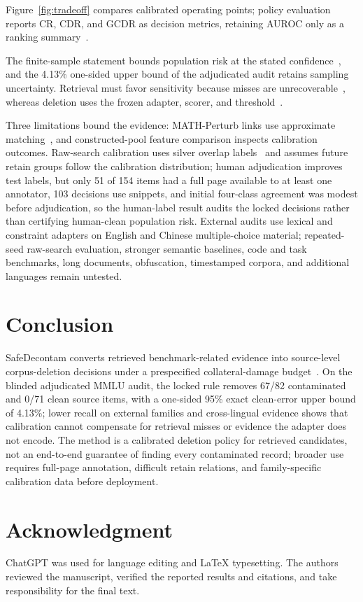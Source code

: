 \documentclass[conference]{IEEEtran}
\begin{document}
Figure~\ref{fig:tradeoff} compares calibrated operating points; policy evaluation reports CR, CDR, and GCDR as decision metrics, retaining AUROC only as a ranking summary~\cite{bates2021}.

The finite-sample statement bounds population risk at the stated confidence~\cite{clopper1934}, and the 4.13\% one-sided upper bound of the adjudicated audit retains sampling uncertainty. Retrieval must favor sensitivity because misses are unrecoverable~\cite{robertson2009}, whereas deletion uses the frozen adapter, scorer, and threshold~\cite{bates2021}.

Three limitations bound the evidence: MATH-Perturb links use approximate matching~\cite{huang2025}, and constructed-pool feature comparison inspects calibration outcomes. Raw-search calibration uses silver overlap labels~\cite{li2024} and assumes future retain groups follow the calibration distribution; human adjudication improves test labels, but only 51 of 154 items had a full page available to at least one annotator, 103 decisions use snippets, and initial four-class agreement was modest before adjudication, so the human-label result audits the locked decisions rather than certifying human-clean population risk. External audits use lexical and constraint adapters on English and Chinese multiple-choice material; repeated-seed raw-search evaluation, stronger semantic baselines, code and task benchmarks, long documents, obfuscation, timestamped corpora, and additional languages remain untested.

\section{Conclusion}
SafeDecontam converts retrieved benchmark-related evidence into source-level corpus-deletion decisions under a prespecified collateral-damage budget~\cite{bates2021}. On the blinded adjudicated MMLU audit, the locked rule removes 67/82 contaminated and 0/71 clean source items, with a one-sided 95\% exact clean-error upper bound of 4.13\%; lower recall on external families and cross-lingual evidence shows that calibration cannot compensate for retrieval misses or evidence the adapter does not encode. The method is a calibrated deletion policy for retrieved candidates, not an end-to-end guarantee of finding every contaminated record; broader use requires full-page annotation, difficult retain relations, and family-specific calibration data before deployment.

\section*{Acknowledgment}
ChatGPT was used for language editing and LaTeX typesetting. The authors reviewed the manuscript, verified the reported results and citations, and take responsibility for the final text.
\end{document}
